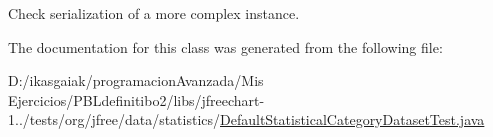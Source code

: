 Check serialization of a more complex instance. 

The documentation for this class was generated from the following file\+:\begin{DoxyCompactItemize}
\item 
D\+:/ikasgaiak/programacion\+Avanzada/\+Mis Ejercicios/\+P\+B\+Ldefinitibo2/libs/jfreechart-\/1../tests/org/jfree/data/statistics/\mbox{\hyperlink{_default_statistical_category_dataset_test_8java}{Default\+Statistical\+Category\+Dataset\+Test.\+java}}\end{DoxyCompactItemize}
